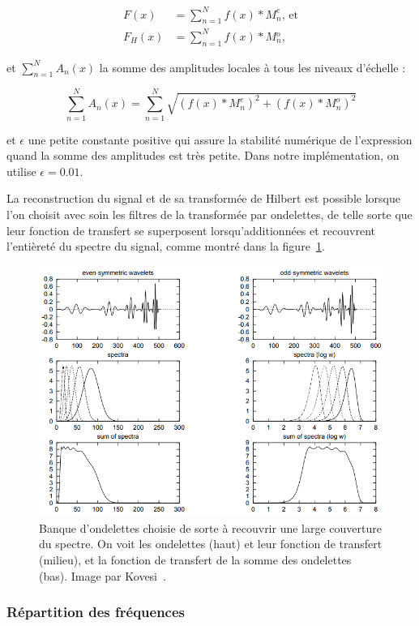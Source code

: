 \begin{align}
    F(x) &= \sum_{n=1}^{N} f(x)*M_n^e, \,\text{et}\\
    F_H(x) &= \sum_{n=1}^{N} f(x)*M{_n^o},
\end{align}

et $\sum_{n=1}^{N} A_n(x)$ la somme des amplitudes locales à tous les niveaux d'échelle :

\begin{equation}
    \sum_{n=1}^{N} A_n(x) = \sum_{n=1}^{N} \sqrt{(f(x)*M^e_n)^2 + (f(x)*M^o_n)^2}
\end{equation}

et $\epsilon$ une petite constante positive qui assure la stabilité numérique de l'expression quand la somme des amplitudes est très petite. Dans notre implémentation, on utilise $\epsilon = 0.01$.

\bigskip

La reconstruction du signal et de sa transformée de Hilbert est possible lorsque l'on choisit avec soin les filtres de la transformée par ondelettes, de telle sorte que leur fonction de transfert se superposent lorsqu'additionnées et recouvrent l'entièreté du spectre du signal, comme montré dans la figure~\ref{fig:wavelet-spectrum-coverage}.

\begin{figure}
           \centering
           \includegraphics[width=.60\textwidth]{contenu/resources/images/wavelet_spectrum_coverage}
           \caption[Choix des ondelettes pour recouvrir le spectre et permettre la reconstruction du signal]{Banque d'ondelettes choisie de sorte à recouvrir une large couverture du spectre. On voit les ondelettes (haut) et leur fonction de transfert (milieu), et la fonction de transfert de la somme des ondelettes (bas). Image par Kovesi~\cite{kovesi_image_1995}.}
           \label{fig:wavelet-spectrum-coverage}
\end{figure}

\subsubsection{Répartition des fréquences}

